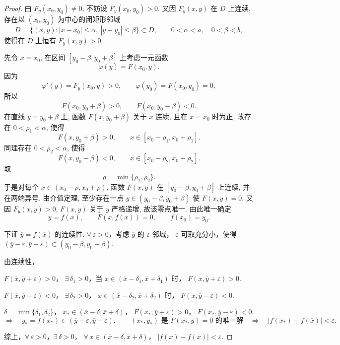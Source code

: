 \begin{proof}
	由 $F_y(x_0,y_0)\ne0$, 不妨设
	$F_y(x_0,y_0)>0$. 又因 $F_y(x,y)$ 在 $D$ 上连续,
	存在以 $(x_0,y_0)$ 为中心的闭矩形邻域
	\[
	\overline D=
	\{(x,y):|x-x_0|\le\alpha,\ |y-y_0|\le\beta\}
	\subset D,
	\qquad
	0<\alpha<a,\quad 0<\beta<b,
	\]
	使得在 $\overline D$ 上恒有 $F_y(x,y)>0$.

	先令 $x=x_0$, 在区间
	$[y_0-\beta,y_0+\beta]$ 上考虑一元函数
	\[
	\varphi(y)=F(x_0,y).
	\]
	因为
	\[
	\varphi'(y)=F_y(x_0,y)>0,
	\qquad
	\varphi(y_0)=F(x_0,y_0)=0,
	\]
	所以
	\[
	F(x_0,y_0+\beta)>0,
	\qquad
	F(x_0,y_0-\beta)<0.
	\]
	在直线 $y=y_0+\beta$ 上, 函数
	$F(x,y_0+\beta)$ 关于 $x$ 连续, 且在 $x=x_0$ 时为正,
	故存在 $0<\rho_1<\alpha$, 使得
	\[
	F(x,y_0+\beta)>0,
	\qquad
	x\in[x_0-\rho_1,x_0+\rho_1].
	\]
	同理存在 $0<\rho_2<\alpha$, 使得
	\[
	F(x,y_0-\beta)<0,
	\qquad
	x\in[x_0-\rho_2,x_0+\rho_2].
	\]
	取
	\[
	\rho=\min\{\rho_1,\rho_2\}.
	\]
	于是对每个 $x\in(x_0-\rho,x_0+\rho)$,
	函数 $F(x,y)$ 在 $[y_0-\beta,y_0+\beta]$ 上连续,
	并在两端异号. 由介值定理, 至少存在一点
	$y\in(y_0-\beta,y_0+\beta)$ 使 $F(x,y)=0$.
	又因 $F_y(x,y)>0$, $F(x,y)$ 关于 $y$ 严格递增,
	故该零点唯一. 由此唯一确定
	\[
	y=f(x),
	\qquad
	F(x,f(x))=0,
	\qquad
	f(x_0)=y_0.
	\]

	
	下证 $\overline y=f(\overline x)$ 的连续性.
	$\forall\,\varepsilon>0$，考虑 $\overline y$ 的 $\varepsilon$-邻域，
	$\varepsilon$ 可取充分小，使得
	$(\overline y-\varepsilon,\overline y+\varepsilon)\subset(y_0-\beta,y_0+\beta)$.
	
	由连续性，
	
	$F(\overline x,\overline y+\varepsilon)>0$，
	$\exists\,\delta_1>0$，当
	$x\in(\overline x-\delta_1,\overline x+\delta_1)$ 时，
	$F(x,\overline y+\varepsilon)>0$.
	
	$F(\overline x,\overline y-\varepsilon)<0$，
	$\exists\,\delta_2>0$，
	$x\in(\overline x-\delta_2,\overline x+\delta_2)$ 时，
	$F(x,\overline y-\varepsilon)<0$.
	
	$\delta=\min\{\delta_1,\delta_2\}$，
	$x_*\in(\overline x-\delta,\overline x+\delta)$，
	$F(x_*,\overline y+\varepsilon)>0$，
	$F(x_*,\overline y-\varepsilon)<0$.
	\[
	\Rightarrow\quad
	y_*=f(x_*)\in(\overline y-\varepsilon,\overline y+\varepsilon),
	\qquad
	(x_*,y_*)\text{ 是 }F(x_*,y)=0\text{ 的唯一解}
	\quad\Rightarrow\quad
	|f(x_*)-f(\overline x)|<\varepsilon.
	\]
	
	综上，$\forall\,\varepsilon>0$，$\exists\,\delta>0$，
	$\forall\,x\in(\overline x-\delta,\overline x+\delta)$，
	$|f(x)-f(\overline x)|<\varepsilon$.


\end{proof}

